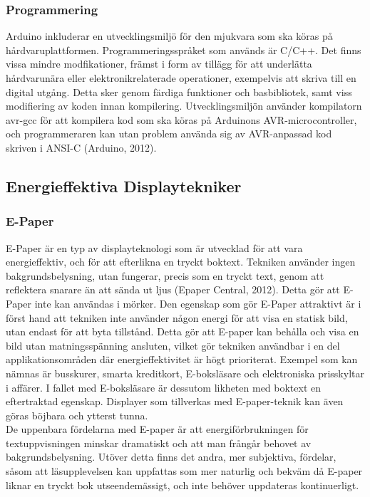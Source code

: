 \documentclass[a4paper,11pt]{article}
\begin{document}
\subsubsection{Programmering}	
Arduino inkluderar en utvecklingsmiljö för den mjukvara som ska köras på hårdvaruplattformen. Programmeringsspråket som används är C/C++. Det finns vissa mindre modfikationer, främst i form av tillägg för att underlätta hårdvarunära eller elektronikrelaterade operationer, exempelvis att skriva till en digital utgång. Detta sker genom färdiga funktioner och basbibliotek, samt viss modifiering av koden innan kompilering. Utvecklingsmiljön använder kompilatorn avr-gcc för att kompilera kod som ska köras på Arduinons AVR-microcontroller, och programmeraren kan utan problem använda sig av AVR-anpassad kod skriven i ANSI-C (Arduino, 2012).

\subsection{Energieffektiva Displaytekniker}

\subsubsection{E-Paper}
E-Paper är en typ av displayteknologi som är utvecklad för att vara energieffektiv, och för att efterlikna en tryckt boktext. Tekniken använder ingen bakgrundsbelysning, utan fungerar, precis som en tryckt text, genom att reflektera snarare än att sända ut ljus (Epaper Central, 2012). Detta gör att E-Paper inte kan användas i mörker. Den egenskap som gör E-Paper attraktivt är i först hand att tekniken inte använder någon energi för att visa en statisk bild, utan endast för att byta tillstånd. Detta gör att E-paper kan behålla och visa en bild utan matningsspänning ansluten, vilket gör tekniken användbar i en del applikationsområden där energieffektivitet är högt prioriterat. Exempel som kan nämnas är busskurer, smarta kreditkort, E-boksläsare och elektroniska prisskyltar i affärer. I fallet med E-boksläsare är dessutom likheten med boktext en eftertraktad egenskap. Displayer som tillverkas med E-paper-teknik kan även göras böjbara och ytterst tunna. \\

De uppenbara fördelarna med E-paper är att energiförbrukningen för textuppvisningen minskar dramatiskt och att man frångår behovet av bakgrundsbelysning. Utöver detta finns det andra, mer subjektiva, fördelar, såsom att läsupplevelsen kan uppfattas som mer naturlig och bekväm då E-paper liknar en tryckt bok utseendemässigt, och inte behöver uppdateras kontinuerligt. \\
\end{document}

